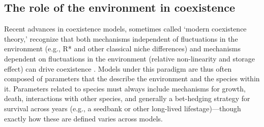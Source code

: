 \documentclass[11pt,letterpaper]{article}
\begin{document}


\subsection{The role of the environment in coexistence} %
Recent advances in coexistence models, sometimes called `modern coexistence theory,' recognize that both mechanisms independent of fluctuations in the environment (e.g., R* and other classical niche differences) and mechanisms dependent on fluctuations in the environment (relative non-linearity and storage effect) can drive coexistence \citep{Chesson:1997dz,Chesson:2000vd}. Models under this paradigm are thus often composed of parameters that the describe the environment and the species within it. Parameters related to species must always include mechanisms for growth, death, interactions with other species, and generally a bet-hedging strategy for survival across years (e.g., a seedbank or other long-lived lifestage)---though exactly how these are defined varies across models.
\end{document}
